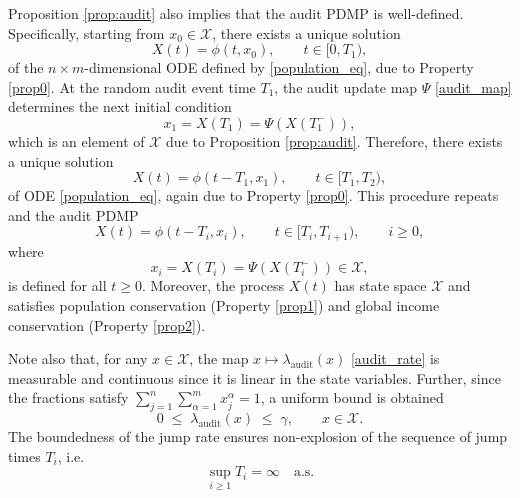 \documentclass[11pt]{article}
\theoremstyle{plain}
\theoremstyle{definition}
\newcommand{\1}{\mathbf{1}}
\begin{document}
Proposition \ref{prop:audit} also implies that the audit PDMP is well-defined. Specifically, starting from $x_0 \in \mathcal{X}$, there exists a unique solution 
\begin{equation*}
    X(t)=\phi (t,x_0), \qquad t \in [0,T_1),
\end{equation*}
of the $n\times m$-dimensional ODE defined by \eqref{population_eq}, due to Property \ref{prop0}. At the random  audit event time $T_1$, the audit update map $\Psi$ \eqref{audit_map} determines the next initial condition 
\begin{equation*}
    x_1=X(T_1)=\Psi (X(T_1^-)),
\end{equation*}
which is an element of $\mathcal{X}$ due to Proposition \ref{prop:audit}. Therefore, there exists a unique solution 
\begin{equation*}
    X(t)=\phi (t-T_1,x_1), \qquad t \in [T_1,T_2),
\end{equation*}
of ODE \eqref{population_eq}, again due to Property \ref{prop0}. This procedure repeats and the audit PDMP
\begin{equation*}
    X(t)=\phi(t-T_i,x_i), \qquad t \in [T_i,T_{i+1}), \qquad i\geq 0,
\end{equation*}
where
\begin{equation*}
    x_i=X(T_i)=\Psi (X(T_i^-)) \in \mathcal{X},
\end{equation*}
is defined for all $t\geq 0$. Moreover, the process $X(t)$ has state space $\mathcal{X}$ and satisfies population conservation (Property \ref{prop1}) and global income conservation (Property \ref{prop2}).

Note also that, for any $x \in \mathcal{X}$, the map $x \mapsto \lambda_{\text{audit}}(x)$ \eqref{audit_rate} is measurable and continuous since it is linear in the state variables. Further, since the fractions satisfy $\sum_{j=1}^n\sum_{\alpha=1}^m x_j^\alpha=1$, 
a uniform bound is obtained
 \begin{equation*}
  0 \;\leq\; \lambda_{\text{audit}}(x) \;\leq\; \gamma, \qquad x \in \mathcal{X}.   
 \end{equation*}
The boundedness of the jump rate ensures non-explosion of the sequence of jump times $T_i$, i.e.
\begin{equation*}
\sup_{i\ge 1} T_i = \infty \quad \text{a.s}.    
\end{equation*}


\end{document}

